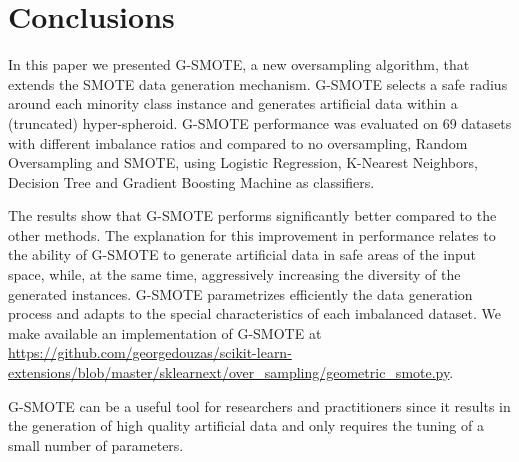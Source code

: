 \documentclass[parskip=full]{scrartcl}
\begin{document}
\section{Conclusions}

In this paper we presented G-SMOTE, a new oversampling algorithm, that extends
the SMOTE data generation mechanism. G-SMOTE selects a safe radius around each
minority class instance and generates artificial data within a (truncated)
hyper-spheroid. G-SMOTE performance was evaluated on 69 datasets with different
imbalance ratios and compared to no oversampling, Random Oversampling and SMOTE,
using Logistic Regression, K-Nearest Neighbors, Decision Tree and Gradient
Boosting Machine as classifiers.

The results show that G-SMOTE performs significantly better compared to the
other methods. The explanation for this improvement in performance relates to
the ability of G-SMOTE to generate artificial data in safe areas of the input
space, while, at the same time, aggressively increasing the diversity of the
generated instances. G-SMOTE parametrizes efficiently the data generation
process and adapts to the special characteristics of each imbalanced dataset. We
make available an implementation of G-SMOTE at
\url{https://github.com/georgedouzas/scikit-learn-extensions/blob/master/sklearnext/over_sampling/geometric_smote.py}.

G-SMOTE can be a useful tool for researchers and practitioners since it results
in the generation of high quality artificial data and only requires the tuning
of a small number of parameters.



\end{document}
